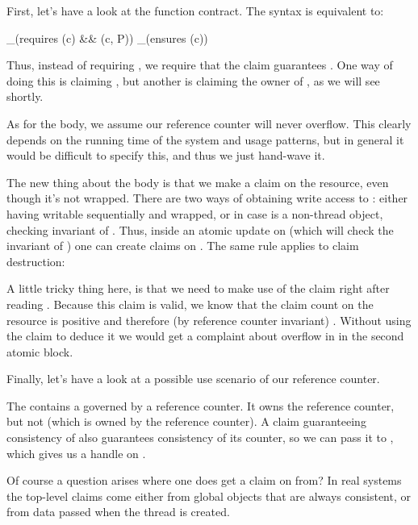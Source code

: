 
\noindent
First, let's have a look at the function contract.
The syntax  is equivalent to:
\begin{VCC}
  _(requires \wrapped(c) && \claims(c, P))
  _(ensures \wrapped(c))
\end{VCC}
Thus, instead of requiring , we require that the claim
guarantees .
One way of doing this is claiming , but another is claiming the owner
of , as we will see shortly.

As for the body, we assume our reference counter will never overflow.
This clearly depends on the running time of the system and usage patterns,
but in general it would be difficult to specify this, and thus we just
hand-wave it.

The new thing about the body is that we make a claim on the resource,
even though it's not wrapped.
There are two ways of obtaining write access to :
either having  writable sequentially and wrapped,
or in case  is a non-thread object, checking
invariant of .
Thus, inside an atomic update on  (which will check the invariant of ) one can create
claims on .
The same rule applies to claim destruction:


\noindent
A little tricky thing here, is that we need to make use of the  claim
right after reading . 
Because this claim is valid, we know that the claim count on the resource
is positive and therefore (by reference counter invariant) .
Without using the  claim to deduce it we would get a complaint
about overflow in  in the second atomic block.

Finally, let's have a look at a possible use scenario of our reference counter.


\noindent
The  contains a  governed by a reference counter.
It owns the reference counter, but not  (which is owned by the reference
counter).
A claim guaranteeing consistency of  also guarantees
consistency of its counter, so we can pass it to ,
which gives us a handle on .

Of course a question arises where one does get a claim on  from?
In real systems the top-level claims come either from global objects that are
always consistent, or from data passed when the thread is created.

